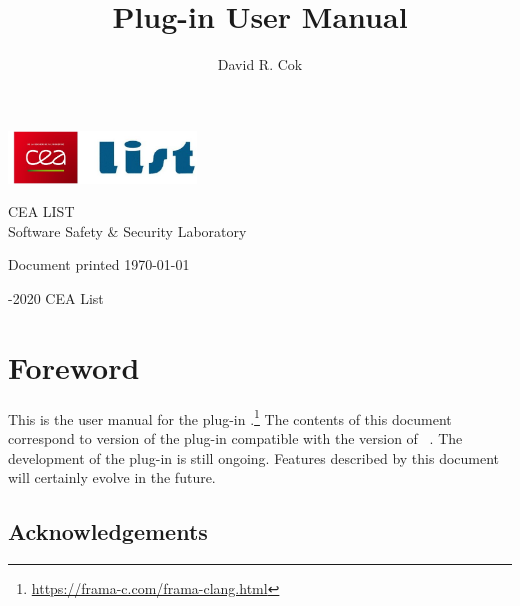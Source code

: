 \documentclass[web]{frama-c-book}
\begin{document}

\begin{titlepage}
\begin{flushleft}
\includegraphics[height=14mm]{cealistlogo.jpg}
\end{flushleft}
\vfill
\title{\fclang Plug-in User Manual}{\fclang \fclangversion}
\author{David R. Cok}
\begin{center}
CEA LIST\\ Software Safety \& Security Laboratory
\end{center}
\begin{center}
	Document printed \ddMyyyydate\today
\end{center}
\vfill
\begin{flushleft}
  -2020 CEA List
\end{flushleft}
\end{titlepage}

\tableofcontents


\chapter*{Foreword}
\markright{}

This is the user manual for the \framac plug-in
\fclang.\footnote{\url{https://frama-c.com/frama-clang.html}} 
The contents of this
document correspond to version \fclangversion of the plug-in compatible with the
\fcversion version of \framac~\cite{userman,fac15}.  The development of
the \fclang plug-in is still ongoing.  Features described by this document will certainly
evolve in the future.

\section*{Acknowledgements}
\end{document}

